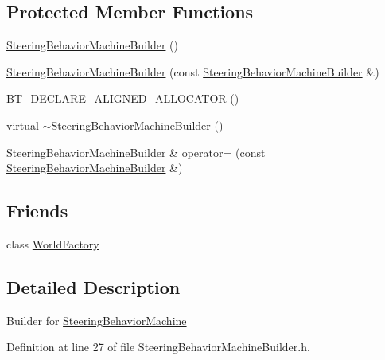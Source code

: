 \subsection*{Protected Member Functions}
\begin{DoxyCompactItemize}
\item 
\mbox{\hyperlink{classnjli_1_1_steering_behavior_machine_builder_a66a63f7b31b5a648cc2a274b41dd1926}{Steering\+Behavior\+Machine\+Builder}} ()
\item 
\mbox{\hyperlink{classnjli_1_1_steering_behavior_machine_builder_a5d7599ea78a2b81221de58191012ec23}{Steering\+Behavior\+Machine\+Builder}} (const \mbox{\hyperlink{classnjli_1_1_steering_behavior_machine_builder}{Steering\+Behavior\+Machine\+Builder}} \&)
\item 
\mbox{\hyperlink{classnjli_1_1_steering_behavior_machine_builder_a1225fb014a8c7de9525d2e3c4c75a0ad}{B\+T\+\_\+\+D\+E\+C\+L\+A\+R\+E\+\_\+\+A\+L\+I\+G\+N\+E\+D\+\_\+\+A\+L\+L\+O\+C\+A\+T\+OR}} ()
\item 
virtual \mbox{\hyperlink{classnjli_1_1_steering_behavior_machine_builder_a5d23afb83c798107a0ede58b5283e0d3}{$\sim$\+Steering\+Behavior\+Machine\+Builder}} ()
\item 
\mbox{\hyperlink{classnjli_1_1_steering_behavior_machine_builder}{Steering\+Behavior\+Machine\+Builder}} \& \mbox{\hyperlink{classnjli_1_1_steering_behavior_machine_builder_ae526bfd3d7dff97423afc16b9057a498}{operator=}} (const \mbox{\hyperlink{classnjli_1_1_steering_behavior_machine_builder}{Steering\+Behavior\+Machine\+Builder}} \&)
\end{DoxyCompactItemize}
\subsection*{Friends}
\begin{DoxyCompactItemize}
\item 
class \mbox{\hyperlink{classnjli_1_1_steering_behavior_machine_builder_acb96ebb09abe8f2a37a915a842babfac}{World\+Factory}}
\end{DoxyCompactItemize}


\subsection{Detailed Description}
Builder for \mbox{\hyperlink{classnjli_1_1_steering_behavior_machine}{Steering\+Behavior\+Machine}} 

Definition at line 27 of file Steering\+Behavior\+Machine\+Builder.\+h.



